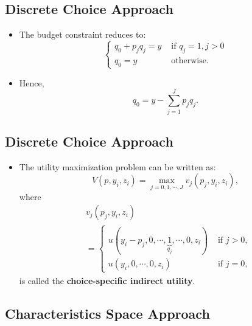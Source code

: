 \documentclass[
]{book}
\providecommand{\tightlist}{%
  \setlength{\itemsep}{0pt}\setlength{\parskip}{0pt}}
\begin{document}
\hypertarget{discrete-choice-approach-1}{%
\subsection{Discrete Choice Approach}\label{discrete-choice-approach-1}}

\begin{itemize}
\tightlist
\item
  The budget constraint reduces to:
  \begin{equation}
  \begin{cases}
  q_0 + p_j q_j = y &\text{   if   } q_j = 1, j > 0\\
  q_0 = y &\text{   otherwise}.
  \end{cases}
  \end{equation}
\item
  Hence,
  \begin{equation}
  q_0 = y - \sum_{j = 1}^J p_j q_j.
  \end{equation}
\end{itemize}

\hypertarget{discrete-choice-approach-2}{%
\subsection{Discrete Choice Approach}\label{discrete-choice-approach-2}}

\begin{itemize}
\tightlist
\item
  The utility maximization problem can be written as:
  \begin{equation}
  V(p, y_i, z_i) = \max_{j = 0, 1, \cdots, J}  v_j(p_j, y_i, z_i),
  \end{equation}
  where
  \begin{equation}
  \begin{split}
  &v_j(p_j, y_i, z_i)\\
  & =
  \begin{cases}
  u(y_i - p_j, 0, \cdots, \underbrace{1}_{q_j}, \cdots, 0, z_i) &\text{   if  }j > 0,\\
  u(y_i, 0, \cdots, 0, z_i) &\text{   if   }j = 0,
  \end{cases}
  \end{split}
  \end{equation}
  is called the \textbf{choice-specific indirect utility}.
\end{itemize}

\hypertarget{characteristics-space-approach}{%
\subsection{Characteristics Space Approach}\label{characteristics-space-approach}}
\end{document}
